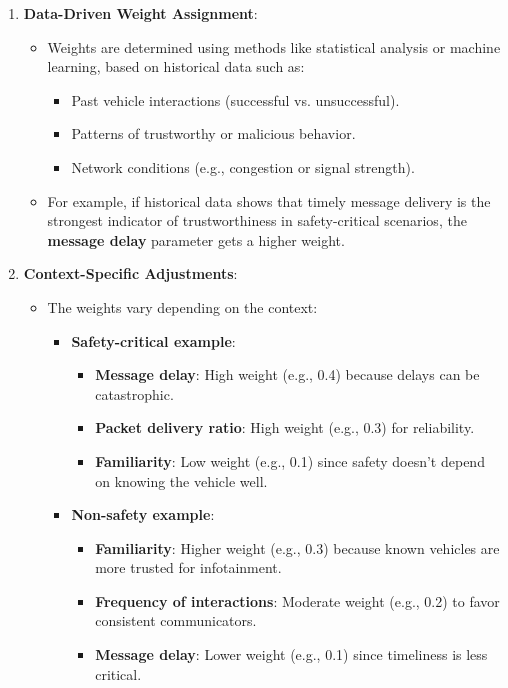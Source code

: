 \documentclass{article}
\begin{document}
\begin{enumerate}
    \item \textbf{Data-Driven Weight Assignment}:
    \begin{itemize}
        \item Weights are determined using methods like statistical analysis or machine learning, based on historical data such as:
        \begin{itemize}
            \item Past vehicle interactions (successful vs. unsuccessful).
            \item Patterns of trustworthy or malicious behavior.
            \item Network conditions (e.g., congestion or signal strength).
        \end{itemize}
        \item For example, if historical data shows that timely message delivery is the strongest indicator of trustworthiness in safety-critical scenarios, the \textbf{message delay} parameter gets a higher weight.
    \end{itemize}
    
    \item \textbf{Context-Specific Adjustments}:
    \begin{itemize}
        \item The weights vary depending on the context:
        \begin{itemize}
            \item \textbf{Safety-critical example}:
            \begin{itemize}
                \item \textbf{Message delay}: High weight (e.g., 0.4) because delays can be catastrophic.
                \item \textbf{Packet delivery ratio}: High weight (e.g., 0.3) for reliability.
                \item \textbf{Familiarity}: Low weight (e.g., 0.1) since safety doesn’t depend on knowing the vehicle well.
            \end{itemize}
            \item \textbf{Non-safety example}:
            \begin{itemize}
                \item \textbf{Familiarity}: Higher weight (e.g., 0.3) because known vehicles are more trusted for infotainment.
                \item \textbf{Frequency of interactions}: Moderate weight (e.g., 0.2) to favor consistent communicators.
                \item \textbf{Message delay}: Lower weight (e.g., 0.1) since timeliness is less critical.
            \end{itemize}
        \end{itemize}
    \end{itemize}
    

\end{enumerate}
\end{document}
